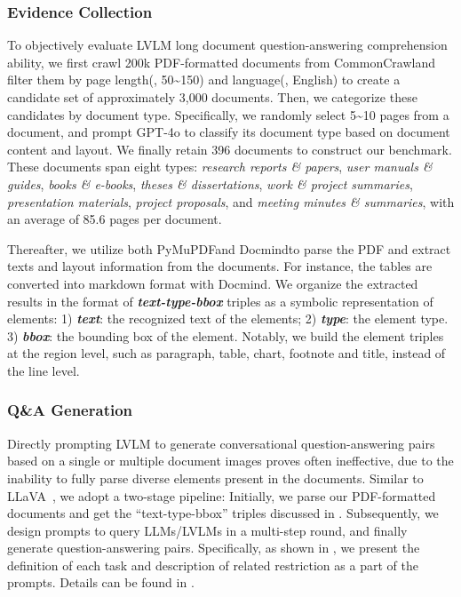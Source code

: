 \subsubsection{Evidence Collection}
\label{subsubsec:evidence_collection}
To objectively evaluate LVLM long document question-answering comprehension ability, we first crawl 200k PDF-formatted documents from CommonCrawl\footnotemark[1] and filter them by page length(\ie, 50\textasciitilde 150) and language(\ie, English) to create a candidate set of approximately 3,000 documents. Then, we categorize these candidates by document type. Specifically, we randomly select 5\textasciitilde10 pages from a document, and prompt GPT-4o to classify its document type based on document content and layout. We finally retain 396 documents to construct our benchmark. These documents span eight types: \emph{research reports \& papers}, \emph{user manuals \& guides}, \emph{books \& e-books}, \emph{theses \& dissertations}, \emph{work \& project summaries}, \emph{presentation materials}, \emph{project proposals}, and \emph{meeting minutes \& summaries}, with an average of 85.6 pages per document.


Thereafter, we utilize both PyMuPDF\footnotemark[2] and Docmind\footnotemark[3] to parse the PDF and extract texts and layout information from the documents. For instance, the tables are converted into markdown format with Docmind. We organize the extracted results in the format of \emph{\textbf{text-type-bbox}} triples as a symbolic representation of elements: 1) \emph{\textbf{text}}: the recognized text of the elements; 2) \emph{\textbf{type}}: the element type. 3) \emph{\textbf{bbox}}: the bounding box of the element. Notably, we build the element triples at the region level, such as paragraph, table, chart, footnote and title, instead of the line level.


\subsubsection{Q\&A Generation}
\label{Data Generation}

Directly prompting LVLM to generate conversational question-answering pairs based on a single or multiple document images proves often ineffective, due to the inability to fully parse diverse elements present in the documents. Similar to LLaVA~\cite{LLaVA}, we adopt a two-stage pipeline: Initially, we parse our PDF-formatted documents and get the ``text-type-bbox'' triples discussed in . Subsequently, we design prompts to query LLMs/LVLMs in a multi-step round, and finally generate question-answering pairs. Specifically, as shown in , we present the definition of each task and description of related restriction as a part of the prompts. Details can be found in .

